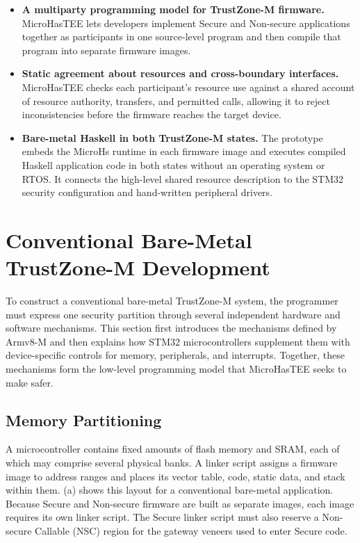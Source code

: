 \documentclass[sigconf]{acmart}
\begin{document}
\begin{itemize}
  \item \textbf{A multiparty programming model for TrustZone-M firmware.}
  MicroHasTEE lets developers implement Secure and Non-secure applications together as participants in one source-level program and then compile that program into separate firmware images.

  \item \textbf{Static agreement about resources and cross-boundary interfaces.}
  MicroHasTEE checks each participant's resource use against a shared account of resource authority, transfers, and permitted calls, allowing it to reject inconsistencies before the firmware reaches the target device.

  \item \textbf{Bare-metal Haskell in both TrustZone-M states.}
  The prototype embeds the MicroHs runtime in each firmware image and executes compiled Haskell application code in both states without an operating system or RTOS.
  It connects the high-level shared resource description to the STM32 security configuration and hand-written peripheral drivers.
\end{itemize}

\section{Conventional Bare-Metal TrustZone-M Development}

To construct a conventional bare-metal TrustZone-M system, the programmer must express one security partition through several independent hardware and software mechanisms.
This section first introduces the mechanisms defined by Armv8-M and then explains how STM32 microcontrollers supplement them with device-specific controls for memory, peripherals, and interrupts.
Together, these mechanisms form the low-level programming model that MicroHasTEE seeks to make safer.

\subsection{Memory Partitioning}

A microcontroller contains fixed amounts of flash memory and SRAM, each of which may comprise several physical banks.
A linker script assigns a firmware image to address ranges and places its vector table, code, static data, and stack within them.
(a) shows this layout for a conventional bare-metal application.
Because Secure and Non-secure firmware are built as separate images, each image requires its own linker script.
The Secure linker script must also reserve a Non-secure Callable (NSC) region for the gateway veneers used to enter Secure code.
\end{document}
